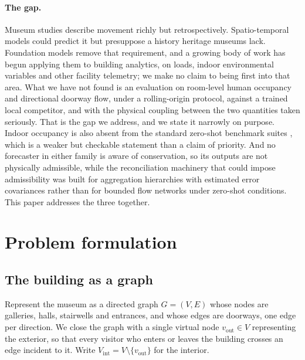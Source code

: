 \documentclass[11pt]{article}
\theoremstyle{plain}
\theoremstyle{definition}
\theoremstyle{remark}
\begin{document}
\paragraph{The gap.}
Museum studies describe movement richly but retrospectively. Spatio-temporal models could predict it but presuppose a history heritage museums lack. Foundation models remove that requirement, and a growing body of work has begun applying them to building analytics, on loads, indoor environmental variables and other facility telemetry; we make no claim to being first into that area. What we have not found is an evaluation on room-level human occupancy and directional doorway flow, under a rolling-origin protocol, against a trained local competitor, and with the physical coupling between the two quantities taken seriously. That is the gap we address, and we state it narrowly on purpose. Indoor occupancy is also absent from the standard zero-shot benchmark suites \citep{aksu2024gifteval}, which is a weaker but checkable statement than a claim of priority. And no forecaster in either family is aware of conservation, so its outputs are not physically admissible, while the reconciliation machinery that could impose admissibility was built for aggregation hierarchies with estimated error covariances rather than for bounded flow networks under zero-shot conditions. This paper addresses the three together.

\section{Problem formulation}
\label{sec:formulation}

\subsection{The building as a graph}

Represent the museum as a directed graph $G=(V,E)$ whose nodes are galleries, halls, stairwells and entrances, and whose edges are doorways, one edge per direction. We close the graph with a single virtual node $v_{\mathrm{out}} \in V$ representing the exterior, so that every visitor who enters or leaves the building crosses an edge incident to it. Write $V_{\mathrm{int}} = V \setminus \{v_{\mathrm{out}}\}$ for the interior.
\end{document}
